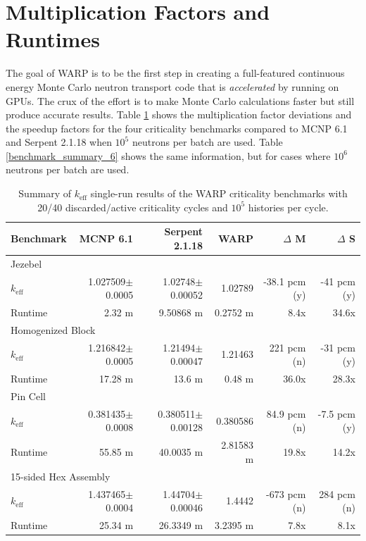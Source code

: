 \section{Multiplication Factors and Runtimes}

The goal of WARP is to be the first step in creating a full-featured continuous energy Monte Carlo neutron transport code that is \emph{accelerated} by running on GPUs.  The crux of the effort is to make Monte Carlo calculations faster but still produce accurate results.  Table \ref{benchmark_summary_5} shows the multiplication factor deviations and the speedup factors for the four criticality benchmarks compared to MCNP 6.1 and Serpent 2.1.18 when $10^5$ neutrons per batch are used.  Table  \ref{benchmark_summary_6} shows the same information, but for cases where $10^6$ neutrons per batch are used.

\begin{table}[h]
\centering
\caption{Summary of $k_\mathrm{eff}$ single-run results of the WARP criticality benchmarks with 20/40 discarded/active criticality cycles and $10^5$ histories per cycle.}
\label{benchmark_summary_5}
\begin{tabular}{| l | r | r | r | r | r |}
 \hline
 Benchmark & MCNP 6.1 & Serpent 2.1.18 & WARP & $\Delta$ M & $\Delta$ S  \\
\hline
\hline
\multicolumn{6}{|l|}{Jezebel}  \\
\hline
 $k_\mathrm{eff}$ & 1.027509$\pm$0.0005 & 1.02748$\pm$0.00052 & 1.02789 & -38.1 pcm (y) & -41 pcm (y) \\
 \hline
 Runtime               & 2.32 m & 9.50868 m & 0.2752 m & 8.4x  & 34.6x  \\
 \hline
 \hline
\multicolumn{6}{|l|}{Homogenized Block }\\
\hline
 $k_\mathrm{eff}$ & 1.216842$\pm$0.0005 & 1.21494$\pm$0.00047 & 1.21463 & 221 pcm (n)  & -31 pcm  (y) \\
 \hline
 Runtime               &  17.28 m & 13.6 m & 0.48 m & 36.0x  & 28.3x  \\
 \hline
  \hline
\multicolumn{6}{|l|}{Pin Cell}\\
\hline
 $k_\mathrm{eff}$ & 0.381435$\pm$0.0008 &  0.380511$\pm$0.00128 & 0.380586 & 84.9 pcm (n)&  -7.5 pcm (y)    \\
 \hline
 Runtime               & 55.85 m & 40.0035 m &  2.81583 m &  19.8x & 14.2x  \\
 \hline
  \hline
\multicolumn{6}{|l|}{15-sided Hex Assembly}\\
\hline
 $k_\mathrm{eff}$ & 1.437465$\pm$0.0004 & 1.44704$\pm$0.00046 & 1.4442 & -673 pcm (n) & 284 pcm (n) \\
 \hline
 Runtime               & 25.34 m &  26.3349 m &  3.2395 m  & 7.8x & 8.1x  \\
 \hline
\end{tabular}
\end{table}


